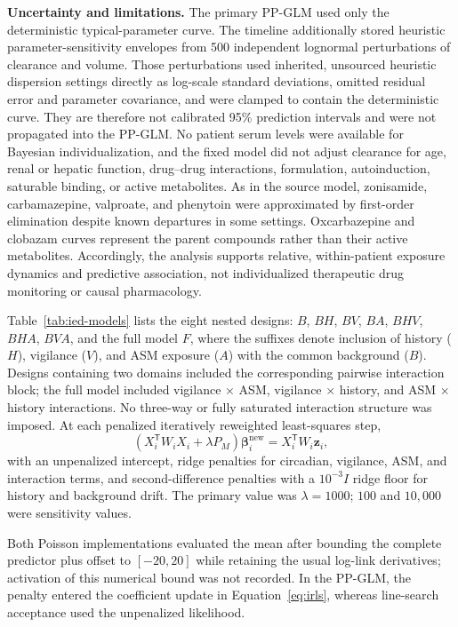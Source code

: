 \documentclass[11pt]{article}
\begin{document}
\textbf{Uncertainty and limitations.} The primary PP-GLM used only the deterministic typical-parameter curve. The timeline additionally stored heuristic parameter-sensitivity envelopes from 500 independent lognormal perturbations of clearance and volume. Those perturbations used inherited, unsourced heuristic dispersion settings directly as log-scale standard deviations, omitted residual error and parameter covariance, and were clamped to contain the deterministic curve. They are therefore not calibrated 95\% prediction intervals and were not propagated into the PP-GLM. No patient serum levels were available for Bayesian individualization, and the fixed model did not adjust clearance for age, renal or hepatic function, drug--drug interactions, formulation, autoinduction, saturable binding, or active metabolites. As in the source model, zonisamide, carbamazepine, valproate, and phenytoin were approximated by first-order elimination despite known departures in some settings. Oxcarbazepine and clobazam curves represent the parent compounds rather than their active metabolites. Accordingly, the analysis supports relative, within-patient exposure dynamics and predictive association, not individualized therapeutic drug monitoring or causal pharmacology.

Table~\ref{tab:ied-models} lists the eight nested designs: $B$, $BH$, $BV$, $BA$, $BHV$, $BHA$, $BVA$, and the full model $F$, where the suffixes denote inclusion of history ($H$), vigilance ($V$), and ASM exposure ($A$) with the common background ($B$). Designs containing two domains included the corresponding pairwise interaction block; the full model included vigilance $\times$ ASM, vigilance $\times$ history, and ASM $\times$ history interactions. No three-way or fully saturated interaction structure was imposed. At each penalized iteratively reweighted least-squares step,
\begin{equation}
(X_i^{\mathsf T}W_iX_i+\lambda P_M)\bm\beta_i^{\mathrm{new}}
=X_i^{\mathsf T}W_i\bm z_i,
\label{eq:irls}
\end{equation}
with an unpenalized intercept, ridge penalties for circadian, vigilance, ASM, and interaction terms, and second-difference penalties with a $10^{-3}I$ ridge floor for history and background drift. The primary value was $\lambda=1000$; $100$ and $10{,}000$ were sensitivity values.

Both Poisson implementations evaluated the mean after bounding the complete predictor plus offset to $[-20,20]$ while retaining the usual log-link derivatives; activation of this numerical bound was not recorded. In the PP-GLM, the penalty entered the coefficient update in Equation~\ref{eq:irls}, whereas line-search acceptance used the unpenalized likelihood.
\end{document}
